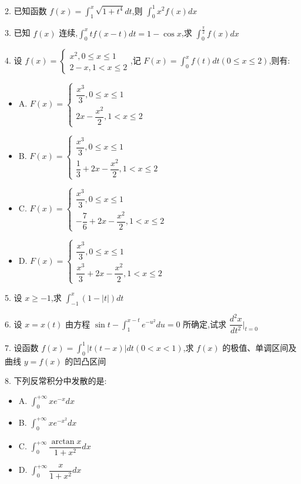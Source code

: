 2. 已知函数 $f(x)=\int_{1}^{x}\sqrt{1+t^{4}}dt$,则 $\int_{0}^{1}x^{2}f(x)dx$

3. 已知 $f(x)$ 连续,$\int_{0}^{x}tf(x-t)dt=1-\cos x$,求 $\int_{0}^{\frac{\pi}{2}}f(x)dx$

4. 设 $f(x)=\begin{cases}
	x^{2},0\leq x\leq 1\\2-x, 1<x\leq 2 
\end{cases}$,记 $F(x)=\int_{0}^{x}f(t)dt(0\leq x\leq 2)$,则有:
\begin{itemize}
	\item A. $F(x)=\begin{cases}
		\dfrac{x^{3}}{3},0\leq x\leq 1\\
		2x-\dfrac{x^{2}}{2}, 1<x\leq 2
	\end{cases}$
	\item B. $F(x)=\begin{cases}
		\dfrac{x^{3}}{3},0\leq x\leq 1\\
		\dfrac{1}{3}+2x-\dfrac{x^{2}}{2}, 1<x\leq 2
	\end{cases}$
	\item C. $F(x)=\begin{cases}
		\dfrac{x^{3}}{3},0\leq x\leq 1\\
		-\dfrac{7}{6}+2x-\dfrac{x^{2}}{2}, 1<x\leq 2
	\end{cases}$
	\item D. $F(x)=\begin{cases}
		\dfrac{x^{3}}{3},0\leq x\leq 1\\
		\dfrac{x^{3}}{3}+2x-\dfrac{x^{2}}{2}, 1<x\leq 2
	\end{cases}$
\end{itemize}

5. 设 $x\geq -1$,求 $\int_{-1}^{x}(1-|t|)dt$

6. 设 $x=x(t)$ 由方程 $\sin t-\int_{1}^{x-t}e^{-u^{2}}du=0$ 所确定,试求 $\dfrac{d^{2}x}{dt^{2}}|_{t=0}$

7. 设函数 $f(x)=\int_{0}^{1}|t(t-x)|dt(0<x<1)$,求 $f(x)$ 的极值、单调区间及曲线 $y=f(x)$ 的凹凸区间

8. 下列反常积分中发散的是:
\begin{itemize}
	\item A. $\int_{0}^{+\infty}xe^{-x}dx$
	\item B. $\int_{0}^{+\infty}xe^{-x^{2}}dx$
	\item C. $\int_{0}^{+\infty}\dfrac{\arctan x}{1+x^{2}}dx$
	\item D. $\int_{0}^{+\infty}\dfrac{x}{1+x^{2}}dx$
\end{itemize}

